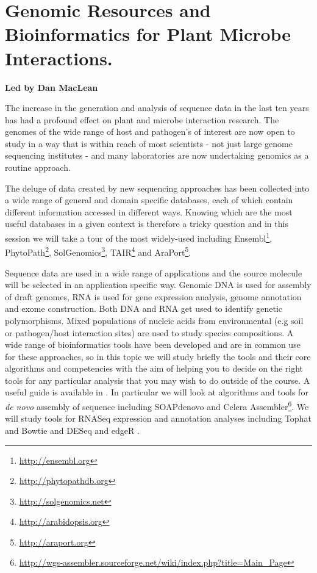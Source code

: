 \documentclass[12pt,]{book}
\let\rmarkdownfootnote\footnote%
\def\footnote{\protect\rmarkdownfootnote}
\renewcommand{\href}[2]{#2\footnote{\url{#1}}}
\theoremstyle{definition}
\theoremstyle{definition}
\theoremstyle{remark}
\begin{document}
\chapter*{Genomic Resources and Bioinformatics for Plant Microbe
Interactions.}\label{genomic-resources-and-bioinformatics-for-plant-microbe-interactions.}

\textbf{Led by Dan MacLean}

The increase in the generation and analysis of sequence data in the last
ten years has had a profound effect on plant and microbe interaction
research. The genomes of the wide range of host and pathogen's of
interest are now open to study in a way that is within reach of most
scientists - not just large genome sequencing institutes - and many
laboratories are now undertaking genomics as a routine approach.

The deluge of data created by new sequencing approaches has been
collected into a wide range of general and domain specific databases,
each of which contain different information accessed in different ways.
Knowing which are the most useful databases in a given context is
therefore a tricky question and in this session we will take a tour of
the most widely-used including \href{http://ensembl.org}{Ensembl},
\href{http://phytopathdb.org}{PhytoPath},
\href{http://solgenomics.net}{SolGenomics},
\href{http://arabidopsis.org}{TAIR} and
\href{http://araport.org}{AraPort}.

Sequence data are used in a wide range of applications and the source
molecule will be selected in an application specific way. Genomic DNA is
used for assembly of draft genomes, RNA is used for gene expression
analysis, genome annotation and exome construction. Both DNA and RNA get
used to identify genetic polymorphisms. Mixed populations of nucleic
acids from environmental (e.g soil or pathogen/host interaction sites)
are used to study species compositions. A wide range of bioinformatics
tools have been developed and are in common use for these approaches, so
in this topic we will study briefly the tools and their core algorithms
and competencies with the aim of helping you to decide on the right
tools for any particular analysis that you may wish to do outside of the
course. A useful guide is available in \citet{MacLean:2009hm}. In
particular we will look at algorithms and tools for \emph{de novo}
assembly of sequence including SOAPdenovo \citep{Luo:2012fn} and
\href{http://wgs-assembler.sourceforge.net/wiki/index.php?title=Main_Page}{Celera
Assembler}. We will study tools for RNASeq expression and annotation
analyses including Tophat \citep{Trapnell:2009dp} and Bowtie
\citep{Langmead:2012jh} and DESeq \citep{Anders:2010fu} and edgeR
\citep{Robinson:2010cw}.
\end{document}
